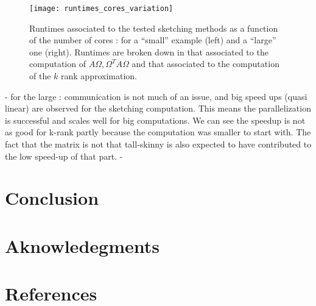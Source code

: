 \documentclass[a4paper, 12pt,oneside]{article}
\begin{document}
		\begin{figure}[htb]       
			\centering             
				\vspace{0em}
				\texttt{[image: runtimes\_cores\_variation]}
				\caption{Runtimes associated to the tested sketching methods as a function of the number of cores : for a ``small'' example (left) and a ``large'' one (right). Runtimes are broken down in that associated to the computation of $A\Omega,\Omega^T A\Omega$ and that associated to the computation of the $k$ rank approximation.}
				\label{fig:runtimes-cores-variation}
		\end{figure}
		- for the large : communication is not much of an issue, and big speed ups (quasi linear) are observed for the sketching computation. This means the parallelization is successful and scales well for big computations. We can see the speedup is not as good for k-rank partly because the computation was smaller to start with. The fact that the matrix is not that tall-skinny is also expected to have contributed to the low speed-up of that part.
		- 

	\section{Conclusion}
	\section*{Aknowledegments}
	\section*{References}
\end{document}
